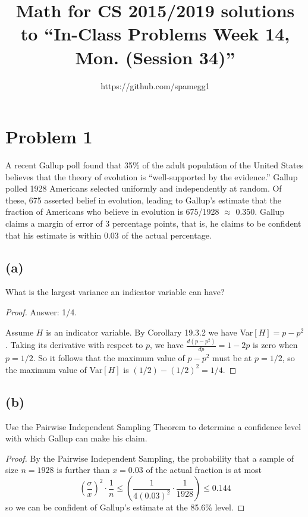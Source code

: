 \documentclass[14pt]{extarticle}
\title{Math for CS 2015/2019 solutions to ``In-Class Problems Week 14, Mon. (Session 34)''}
\author{https://github.com/spamegg1}
\newcommand{\dps}{\displaystyle}
\begin{document}
\maketitle
\tableofcontents

\section{Problem 1}
A recent Gallup poll found that 35\% of the adult population of the United States believes that the theory of evolution is “well-supported by the evidence.” Gallup polled 1928 Americans selected uniformly and independently at random. Of these, 675 asserted belief in evolution, leading to Gallup’s estimate that the fraction of Americans who believe in evolution is 675/1928 $\approx$ 0.350. Gallup claims a margin of error of 3 percentage points, that is, he claims to be confident that his estimate is within 0.03 of the actual percentage.

\subsection{(a)}
What is the largest variance an indicator variable can have?

\begin{proof}
Answer: 1/4.

Assume $H$ is an indicator variable. By Corollary 19.3.2 we have Var$[H] = p - p^2$. Taking its derivative with respect to $p$, we have $\dps\frac{d(p - p^2)}{dp} = 1 - 2p$ is zero when $p = 1/2$. So it follows that the maximum value of $p-p^2$ must be at $p = 1/2$, so the maximum value of Var$[H]$ is $(1/2) - (1/2)^2 = 1/4$.
\end{proof}

\subsection{(b)}
Use the Pairwise Independent Sampling Theorem to determine a confidence level with which Gallup can make his claim.

\begin{proof}
By the Pairwise Independent Sampling, the probability that a sample of size $n = 1928$ is further than $x = 0.03$ of the actual fraction is at most
$$
\left(\frac{\sigma}{x}\right)^2 \cdot \frac{1}{n} \leq \left(\frac{1}{4(0.03)^2} \cdot \frac{1}{1928} \right) \leq 0.144
$$
so we can be confident of Gallup’s estimate at the 85.6\% level.
\end{proof}
\end{document}
